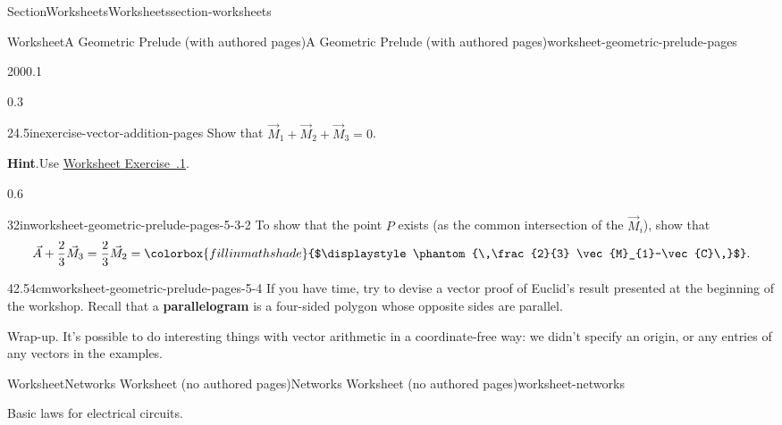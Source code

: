 \documentclass[twoside,10pt,]{article}
\newcommand{\blocktitlefont}{\relax}
\newcommand{\xreffont}{\relax}
\newcommand{\terminology}[1]{\textbf{#1}}
\newcommand{\fillinmath}[1]{\mathchoice{\colorbox{fillinmathshade}{$\displaystyle     \phantom{\,#1\,}$}}{\colorbox{fillinmathshade}{$\textstyle        \phantom{\,#1\,}$}}{\colorbox{fillinmathshade}{$\scriptstyle      \phantom{\,#1\,}$}}{\colorbox{fillinmathshade}{$\scriptscriptstyle\phantom{\,#1\,}$}}}
\numberwithin{equation}{section}
\begin{document}
\begin{sectionptx}{Section}{Worksheets}{}{Worksheets}{}{}{section-worksheets}
\begin{worksheet-subsection}{Worksheet}{A Geometric Prelude (with authored pages)}{}{A Geometric Prelude (with authored pages)}{}{}{worksheet-geometric-prelude-pages}
\begin{sidebyside}{2}{0}{0}{0.1}%
\begin{sbspanel}{0.3}%
\begin{divisionexercise}{2}{}{4.5in}{exercise-vector-addition-pages}%
Show that \(\vec{M}_{1} + \vec{M}_{2} + \vec{M}_{3} = 0\).%
\par\smallskip%
\noindent\textbf{\blocktitlefont Hint}.\hypertarget{exercise-vector-addition-pages-2}{}\quad{}Use \hyperlink{ex-cyclic}{Worksheet Exercise~{\xreffont 35.1.1}}.%
\end{divisionexercise}%
\end{sbspanel}%
\begin{sbspanel}{0.6}%
\begin{divisionexercise}{3}{}{2in}{worksheet-geometric-prelude-pages-5-3-2}%
To show that the point \(P\) exists (as the common intersection of the \(\vec{M}_{i}\)), show that%
\begin{equation*}
\vec{A} + \frac{2}{3} \vec{M}_{3} = \frac{2}{3} \vec{M}_{2} = \fillinmath{\frac{2}{3} \vec{M}_{1}-\vec{C}}\text{.}
\end{equation*}
%
\end{divisionexercise}%
\end{sbspanel}%
\end{sidebyside}%
\begin{divisionexercise}{4}{}{2.54cm}{worksheet-geometric-prelude-pages-5-4}%
If you have time, try to devise a vector proof of Euclid's result presented at the beginning of the workshop. Recall that a \terminology{parallelogram} is a four-sided polygon whose opposite sides are parallel.%
\end{divisionexercise}%
\begin{conclusion}{Wrap-up.}%
It's possible to do interesting things with vector arithmetic in a coordinate-free way: we didn't specify an origin, or any entries of any vectors in the examples.%
\end{conclusion}%
\end{worksheet-subsection}
\restoregeometry
%
%
\typeout{************************************************}
\typeout{************************************************}
%
\begin{worksheet-subsection}{Worksheet}{Networks Worksheet (no authored pages)}{}{Networks Worksheet (no authored pages)}{}{}{worksheet-networks}
\begin{introduction}{Basic laws for electrical circuits.}%

\end{introduction}
\end{worksheet-subsection}
\end{sectionptx}
\end{document}

